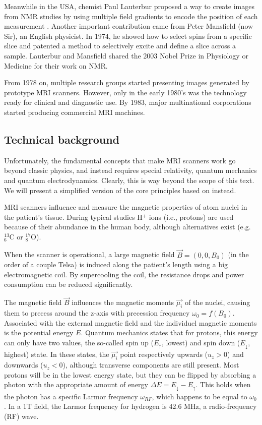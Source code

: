 Meanwhile in the USA, chemist Paul Lauterbur proposed a way to create images
from NMR studies by using multiple field gradients to encode the position of
each measurement \cite{lauterbur1973}. Another important contribution came from
Peter Mansfield (now Sir), an English physicist. In 1974, he showed how to
select spins from a specific slice and patented a method to selectively excite
and define a slice across a sample. Lauterbur and Mansfield shared the 2003
Nobel Prize in Physiology or Medicine for their work on NMR.

From 1978 on, multiple research groups started presenting images generated by
prototype MRI scanners. However, only in the early 1980's was the technology 
ready for clinical and diagnostic use. By 1983, major multinational corporations
started producing commercial MRI machines.

\subsection{Technical background}
Unfortunately, the fundamental concepts that make MRI scanners work go beyond
classic physics, and instead requires special relativity, quantum mechanics and
quantum electrodynamics. Clearly, this is way beyond the scope of this text. We
will present a simplified version of the core principles based on
\cite{suetens} instead.

MRI scanners influence and measure the magnetic properties of atom nuclei in the
patient's tissue. During typical studies H$^+$ ions (i.e., protons) are used
because of their abundance in the human body, although alternatives exist
(e.g. ${}^{13}_6$C or ${}^{17}_8$O).

When the scanner is operational, a large magnetic field $\vec{B} = (0,0,B_0)$
(in the order of a couple Telsa) is induced along the patient's length using a
big electromagnetic coil. By supercooling the coil, the resistance drops and
power consumption can be reduced significantly.

The magnetic field $\vec{B}$ influences the magnetic moments $\vec{\mu_i}$ of
the nuclei, causing them to precess around the z-axis with precession frequency
$\omega_0 = f(B_0)$. Associated with the external magnetic field and the
individuel magnetic moments is the potential energy $E$. Quantum mechanics
states that for protons, this energy can only have two values, the so-called
spin up ($E_\uparrow$, lowest) and spin down ($E_\downarrow$, highest) state. In
these states, the $\vec{\mu_i}$ point respectively upwards ($u_z > 0$) and
downwards ($u_z < 0$), although transverse components are still present. Most
protons will be in the lowest energy state, but they can be flipped by absorbing
a photon with the appropriate amount of energy $\Delta E = E_\downarrow -
E_\uparrow$. This holds when the photon has a specific Larmor frequency
$\omega_{RF}$, which happens to be equal to $\omega_0$. In a 1T field, the
Larmor frequency for hydrogen is 42.6 MHz, a radio-frequency (RF) wave.

